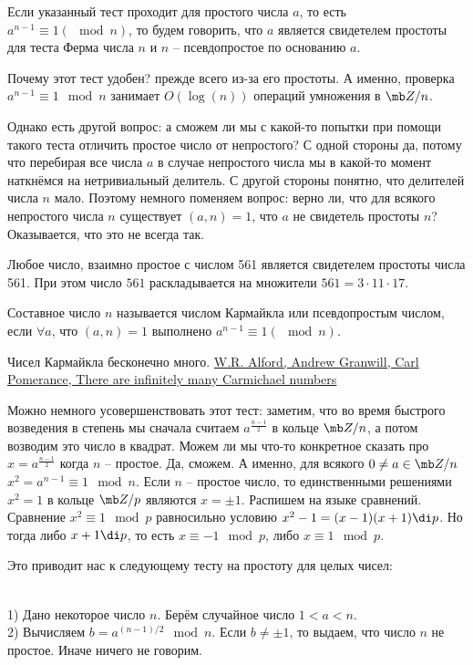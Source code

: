 \dfn Если указанный тест  проходит для простого числа $a$, то есть $a^{n-1}\equiv 1(\mod n)$, то будем говорить, что $a$ является свидетелем простоты для теста Ферма числа $n$ и $n$ -- псевдопростое по основанию $a$.
\edfn

Почему этот тест удобен? прежде всего из-за его простоты. А именно, проверка $a^{n-1}\equiv 1 \mod n$ занимает $O(\log(n))$ операций умножения в $\mb Z/n$. 

Однако есть другой вопрос: а сможем ли мы с какой-то попытки при помощи такого теста отличить простое число от непростого? С одной стороны да, потому что перебирая все числа $a$ в случае непростого числа мы в какой-то момент наткнёмся на нетривиальный делитель. С другой стороны понятно, что делителей числа $n$ мало. Поэтому немного поменяем вопрос: верно ли, что для всякого непростого числа $n$ существует $(a,n)=1$, что $a$ не свидетель простоты $n$? Оказывается, что это не всегда так.

\utv Любое число, взаимно простое с числом 561 является свидетелем простоты числа 561. При этом число $561$ раскладывается на множители $561=3\cdot 11\cdot 17$.
\eutv

\dfn Составное число $n$ называется числом Кармайкла или псевдопростым числом, если $\forall a$, что $(a,n)=1$ выполнено $a^{n-1}\equiv 1(\mod n)$.
\edfn



\fct Чисел Кармайкла бесконечно много. \href{http://www.dms.umontreal.ca/~andrew/PDF/carmichael.pdf}{W.R. Alford, Andrew Granwill, Carl Pomerance, There are infinitely many Carmichael numbers}
\efct

Можно немного усовершенствовать этот тест: заметим, что во время быстрого возведения в степень мы сначала считаем $a^{\frac{n-1}{2}} $ в кольце $\mb Z/n$, а потом возводим это число в квадрат. Можем ли мы что-то конкретное сказать про $x=a^{\frac{n-1}{2}}$ когда $n$ -- простое. Да, сможем. А именно, для всякого $0\neq a \in \mb Z/n$ $x^2=a^{n-1}\equiv 1 \mod n$.
\lm Если $n$ -- простое число, то единственными решениями $x^2=1$ в кольце $\mb Z/p$ являются $x=\pm 1$.
\elm
\proof Распишем на языке сравнений. Сравнение $x^2\equiv 1 \mod p $ равносильно условию $x^2-1=(x-1)(x+1)\di p$. Но тогда либо $x+1\di p$, то есть $x\equiv -1 \mod p$, либо $x\equiv 1 \mod p$.
\endproof

Это приводит нас к следующему тесту на простоту для целых чисел:

\\
1) Дано некоторое число $n$. Берём случайное число $1<a<n$.\\
2) Вычисляем $b=a^{(n-1)/2} \mod n$. Если $b\neq \pm 1$, то выдаем, что число $n$ не простое. Иначе ничего не говорим.




